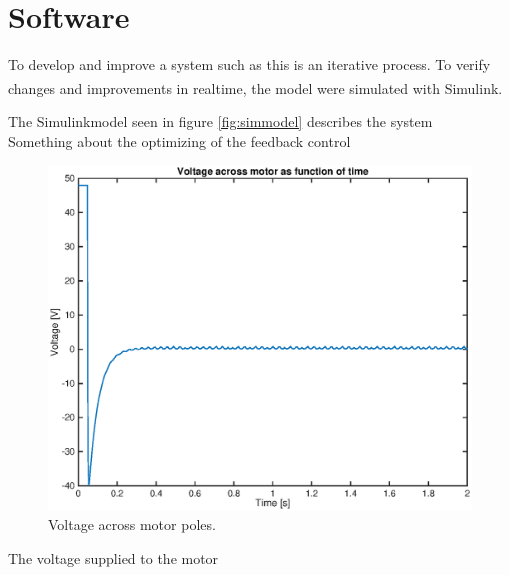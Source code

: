 \documentclass[a4paper,11pt]{kth-mag}
\begin{document}
\section{Software}
To develop and improve a system such as this is an iterative process. To verify changes and improvements in realtime, the model were simulated with Simulink\textsuperscript{\textregistered}. 



The Simulinkmodel seen in figure \ref{fig:simmodel} describes the system
\\ Something about the  optimizing of the feedback control
\begin{figure}[!htb]
\centering
\includegraphics[scale=.7]{voltageplot.eps}
\caption{Voltage across motor poles.}
\label{fig:voltageplot}
\end{figure}

The voltage supplied to the motor
\end{document}
